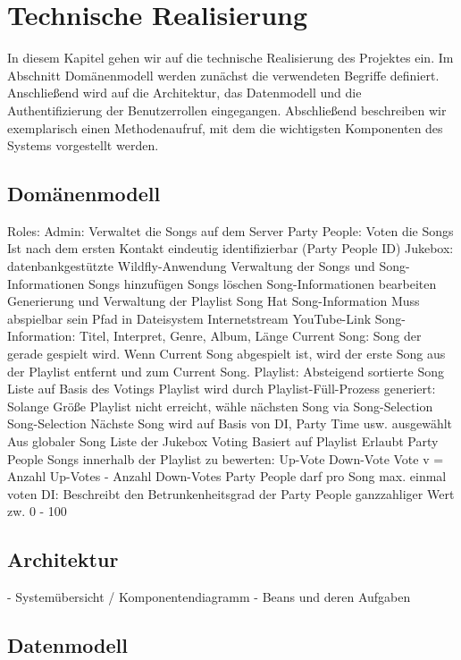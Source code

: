 \section{Technische Realisierung}
In diesem Kapitel gehen wir auf die technische Realisierung des Projektes ein. Im Abschnitt Domänenmodell werden zunächst die verwendeten Begriffe definiert. Anschließend wird auf die Architektur, das Datenmodell und die Authentifizierung der Benutzerrollen eingegangen. Abschließend beschreiben wir exemplarisch einen Methodenaufruf, mit dem die wichtigsten Komponenten des Systems vorgestellt werden.

\subsection{Domänenmodell}



Roles:
Admin: 
Verwaltet die Songs auf dem Server
Party People:
Voten die Songs
Ist nach dem ersten Kontakt eindeutig identifizierbar (Party People ID)
Jukebox: datenbankgestützte Wildfly-Anwendung
Verwaltung der Songs und Song-Informationen
Songs hinzufügen
Songs löschen 
Song-Informationen bearbeiten
Generierung und Verwaltung der Playlist
Song
Hat Song-Information
Muss abspielbar sein
Pfad in Dateisystem
Internetstream
YouTube-Link
Song-Information:
Titel, Interpret, Genre, Album, Länge
Current Song:
Song der gerade gespielt wird.
Wenn Current Song abgespielt ist, wird der erste Song aus der Playlist entfernt und zum Current Song.
Playlist:
Absteigend sortierte Song Liste auf Basis des Votings
Playlist wird durch Playlist-Füll-Prozess generiert:
Solange Größe Playlist nicht erreicht, wähle nächsten Song via Song-Selection
Song-Selection
Nächste Song wird auf Basis von DI, Party Time usw. ausgewählt
Aus globaler Song Liste der Jukebox
Voting
Basiert auf Playlist
Erlaubt Party People Songs innerhalb der Playlist zu bewerten:
Up-Vote
Down-Vote
Vote v = Anzahl Up-Votes - Anzahl Down-Votes
Party People darf pro Song max. einmal voten
DI:
Beschreibt den Betrunkenheitsgrad der Party People
ganzzahliger Wert zw. 0 - 100


\subsection{Architektur}
- Systemübersicht / Komponentendiagramm
- Beans und deren Aufgaben


\subsection{Datenmodell}

